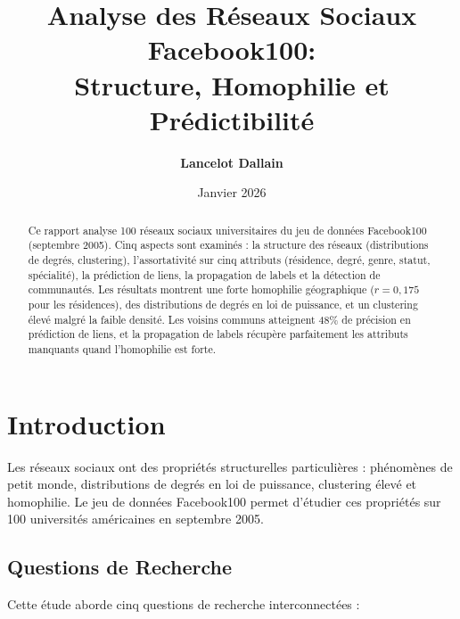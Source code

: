 \documentclass[12pt,a4paper]{article}
\title{\textbf{Analyse des Réseaux Sociaux Facebook100:\\
Structure, Homophilie et Prédictibilité}}
\author{\textbf{Lancelot Dallain}}
\date{Janvier 2026}
\begin{document}
\maketitle

\begin{abstract}
Ce rapport analyse 100 réseaux sociaux universitaires du jeu de données Facebook100 (septembre 2005). Cinq aspects sont examinés : la structure des réseaux (distributions de degrés, clustering), l'assortativité sur cinq attributs (résidence, degré, genre, statut, spécialité), la prédiction de liens, la propagation de labels et la détection de communautés. Les résultats montrent une forte homophilie géographique ($r=0,175$ pour les résidences), des distributions de degrés en loi de puissance, et un clustering élevé malgré la faible densité. Les voisins communs atteignent 48\% de précision en prédiction de liens, et la propagation de labels récupère parfaitement les attributs manquants quand l'homophilie est forte.
\end{abstract}

\section{Introduction}

Les réseaux sociaux ont des propriétés structurelles particulières : phénomènes de petit monde, distributions de degrés en loi de puissance, clustering élevé et homophilie. Le jeu de données Facebook100 permet d'étudier ces propriétés sur 100 universités américaines en septembre 2005.

\subsection{Questions de Recherche}

Cette étude aborde cinq questions de recherche interconnectées :
\end{document}

